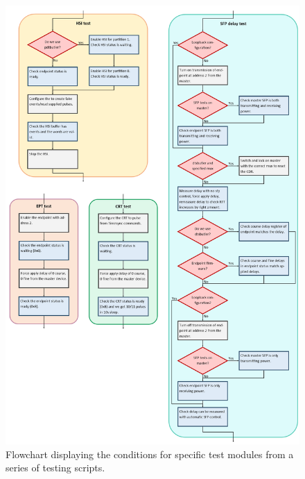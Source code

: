 \documentclass{dune}
\begin{document}
\begin{figure}[ht!]
\begin{center}
\includegraphics[height=0.95\textheight]{figures/flowchart-fdr-modules.png}
\caption{Flowchart displaying the conditions for specific test modules from a series of testing scripts.}
\label{fig:flowchart-modules}
\end{center}
\end{figure}
\FloatBarrier

\printglossary
\printbibliography
\end{document}
